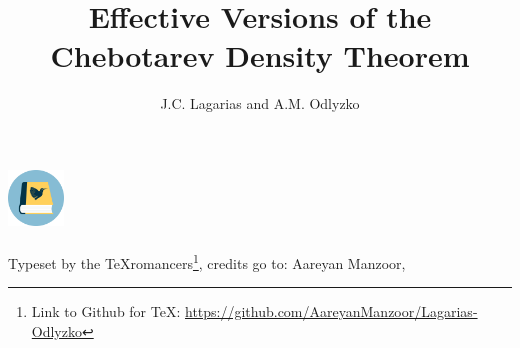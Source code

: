 \documentclass[twoside]{article}
\title{Effective Versions of the Chebotarev Density Theorem}
\author{J.C. Lagarias and A.M. Odlyzko}
\date{\vspace{-2em}}
\begin{document}
\maketitle

\renewcommand{\thefootnote}{$\dagger$}
\begin{center}
    \includegraphics[height=4em]{texromancers.pdf}\\ \phantom{1}\\
    Typeset by the TeXromancers\footnote{Link to Github for TeX: \url{https://github.com/AareyanManzoor/Lagarias-Odlyzko}}, credits go to: Aareyan Manzoor, %
\end{center}
\renewcommand{\thefootnote}{\arabic{footnote}}
 


\tableofcontents
{}

\pagestyle{fancy}











\pagestyle{plain}
\renewcommand*{\bibfont}{\small}
\printbibliography[
heading=bibintoc,
title={Bibliography},
]
\end{document}
